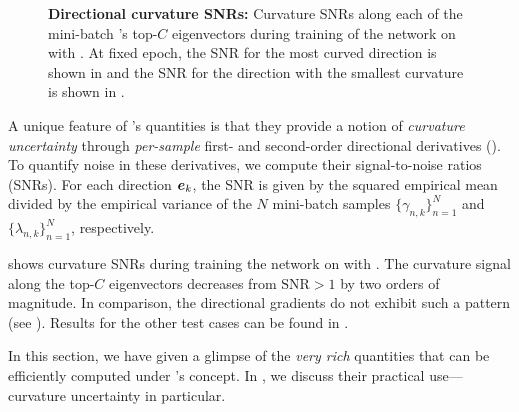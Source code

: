 \begin{figure}
  \centering
  
  \tikzexternalenable
  
  \tikzexternaldisable
  \caption{ \textbf{Directional curvature SNRs:} Curvature SNRs along each of
    the mini-batch \ggn{}'s top-$C$ eigenvectors during training of the
    \threecthreed network on \cifarten with \sgd{}. At fixed epoch, the SNR for
    the most curved direction is shown in
    {\protect{}} and the SNR for the direction with the smallest
    curvature is shown in {\protect{}}. } \label{vivit::fig:directional_derivatives}
\end{figure}

A unique feature of \vivit{}'s quantities is that they provide a notion of
\textit{curvature uncertainty} through \textit{per-sample} first- and
second-order directional derivatives (). To
quantify noise in these derivatives, we compute their signal-to-noise ratios
(SNRs). For each direction ${\bm{e}}_k$, the SNR is given by the squared empirical
mean divided by the empirical variance of the $N$ mini-batch samples
$\{\gamma_{n,k}\}_{n=1}^N$ and $\{\lambda_{n,k}\}_{n=1}^N$, respectively.

 shows curvature SNRs during training
the \threecthreed network on \cifarten with \sgd. The curvature signal along the
top-$C$ eigenvectors decreases from $\text{SNR} > 1$ by two orders of magnitude.
In comparison, the directional gradients do not exhibit such a pattern (see
). Results for the other test cases can
be found in .

In this section, we have given a glimpse of the \textit{very rich} quantities
that can be efficiently computed under \vivit's concept. In
, we discuss their practical use---curvature
uncertainty in particular.

